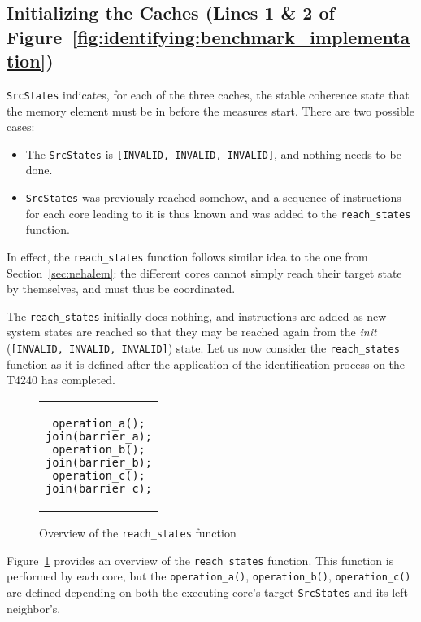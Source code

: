 \subsection{Initializing the Caches (Lines 1 \& 2 of
Figure~\ref{fig:identifying:benchmark_implementation})}
\label{sec:identification:initializing_caches}
\lstinline!SrcStates! indicates, for each of the three caches, the stable
coherence state that the memory element must be in before the measures start.
There are two possible cases:
\begin{itemize}
\item
   The \lstinline!SrcStates! is \lstinline![INVALID, INVALID, INVALID]!,
   and nothing needs to be done.
\item
   \lstinline!SrcStates! was previously reached somehow, and a sequence of
   instructions for each core leading to it is thus known and was added to
   the \lstinline!reach_states! function.
\end{itemize}

In effect, the \lstinline!reach_states! function follows similar idea to the one
from Section~\ref{sec:nehalem}: the different cores cannot simply reach their
target state by themselves, and must thus be coordinated.

The \lstinline!reach_states! initially does nothing, and instructions are added
as new system states are reached so that they may be reached again from the
\emph{init} (\lstinline![INVALID, INVALID, INVALID]!) state. Let us now consider
the \lstinline!reach_states! function as it is defined after the application
of the identification process on the T4240 has completed.

\begin{figure}[hbt!]
\begin{center}
\begin{tabular}{c}
\begin{lstlisting}
operation_a();
join(barrier_a);
operation_b();
join(barrier_b);
operation_c();
join(barrier_c);
\end{lstlisting}
\end{tabular}
\end{center}
\caption{Overview of the \lstinline!reach_states! function}
\label{fig:identifying:reach_states_fun}
\end{figure}

Figure~\ref{fig:identifying:reach_states_fun} provides an overview of the
\lstinline!reach_states! function. This function is performed by each core,
but the \lstinline!operation_a()!, \lstinline!operation_b()!,
\lstinline!operation_c()! are defined depending on both the executing core's
target \lstinline!SrcStates! and its left neighbor's.

